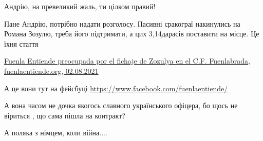 \begin{itemize}
 
Андрію, на превеликий жаль, ти цілком правий!

 

Пане Андрію, потрібно надати розголосу. Пасивні сракограї накинулись на Романа
Зозулю, треба його підтримати, а цих 3,14дарасів поставити на місце. Це їхня
стаття

\href{https://fuenlaentiende.org/2021/08/02/fuenla-entiende-preocupada-por-el-fichaje-de-zozulya-en-el-c-f-fuenlabrada/}{%
Fuenla Entiende preocupada por el fichaje de Zozulya en el C.F. Fuenlabrada, fuenlaentiende.org, 02.08.2021%
}

 
А це вони тут на фейсбуці \url{https://www.facebook.com/fuenlaentiende/}

 
А вона часом не дочка якогось славного українського офіцера, бо щось не віриться , що сама пішла на контракт?

 
А поляка з німцем, коли війна....

 

\end{itemize}
